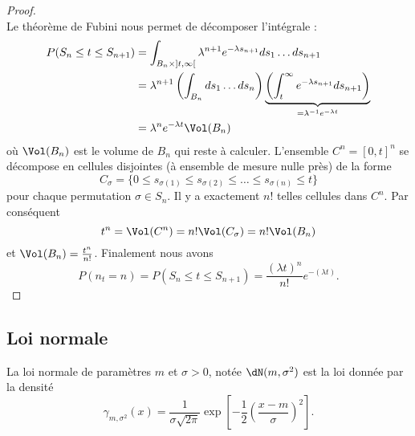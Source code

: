 \begin{proof}
\begin{equation}
	\end{equation}
	Le théorème de Fubini nous permet de décomposer l'intégrale :
	\begin{subequations}
		\begin{align}
			P(S_n\leq t\leq S_{n+1}) & =\int_{B_n\times\mathopen] t , \infty \mathclose[}\lambda^{n+1} e^{-\lambda s_{n+1}}ds_1\ldots ds_{n+1}                                                       \\
			                         & =\lambda^{n+1}\left( \int_{B_n}ds_1\ldots ds_n \right)\underbrace{\left( \int_t^{\infty} e^{-\lambda s_{n+1}}ds_{n+1} \right)}_{=\lambda^{-1} e^{-\lambda t}} \\
			                         & =\lambda^n e^{-\lambda t}\Vol(B_n)
		\end{align}
	\end{subequations}
	où \( \Vol(B_n)\) est le volume de \( B_n\) qui reste à calculer. L'ensemble \( C^n=[0,t]^n\) se décompose en cellules disjointes (à ensemble de mesure nulle près) de la forme
	\begin{equation}
		C_{\sigma}=\{ 0\leq s_{\sigma(1)}\leq s_{\sigma(2)}\leq\ldots\leq s_{\sigma(n)}\leq t \}
	\end{equation}
	pour chaque permutation \( \sigma\in S_n\). Il y a exactement \( n!\) telles cellules dans \( C^n\). Par conséquent
	\begin{equation}
		t^n=\Vol(C^n)=n!\Vol(C_{\sigma})=n!\Vol(B_n)
	\end{equation}
	et \( \Vol(B_n)=\frac{ t^n }{ n! }\). Finalement nous avons
	\begin{equation}
		P(n_t=n)=P(S_n\leq t\leq S_{n+1})=\frac{ (\lambda t)^n }{ n! } e^{-(\lambda t)}.
	\end{equation}

\end{proof}
\subsection{Loi normale}

La loi normale de paramètres \( m\) et \( \sigma>0\), notée \( \dN(m,\sigma^2)\) est la loi donnée par la densité
\begin{equation}
	\gamma_{m,\sigma^2}(x)=\frac{1}{ \sigma\sqrt{2\pi} }\exp\left[ -\frac{ 1 }{2}\left( \frac{ x-m }{ \sigma } \right)^2 \right].
\end{equation}

